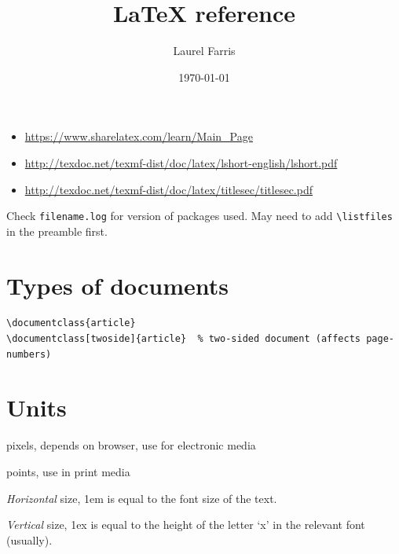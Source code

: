\documentclass{article}
\title{LaTeX reference}
\author{Laurel Farris}
\date{\today}
\begin{document}
\maketitle
\begin{itemize}
    \item \url{https://www.sharelatex.com/learn/Main_Page}
    \item \url{http://texdoc.net/texmf-dist/doc/latex/lshort-english/lshort.pdf}
    \item \url{http://texdoc.net/texmf-dist/doc/latex/titlesec/titlesec.pdf}
\end{itemize}
\tableofcontents\newpage

Check \texttt{filename.log} for version of packages used. May need to add
\verb|\listfiles| in the preamble first.


\section{Types of documents}
\begin{verbatim}
\documentclass{article}
\documentclass[twoside]{article}  % two-sided document (affects page-numbers)
\end{verbatim}

\section{Units}
\begin{description}[itemsep=-1ex]
    \item [px] pixels, depends on browser, use for electronic media
    \item [pt] points, use in print media
    \item [em] \emph{Horizontal} size, 1em is equal to the font size of
        the text.
    \item [ex] \emph{Vertical} size, 1ex is equal to the height of the
        letter `x' in the relevant font (usually).
\end{description}
\end{document}
